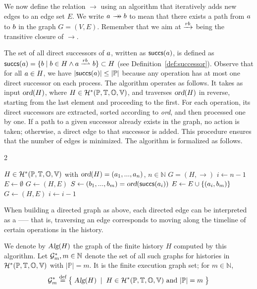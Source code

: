 We now define the relation $\rightarrow$ using an algorithm that iteratively adds new edges to an edge set $E$.  We write $\opa\patharrow\opb$ to mean that there exists a path from $a$ to $b$ in the graph $G=(V,E)$.  Remember that we aim at $\xrightarrow{rb}$ being the transitive closure of $\rightarrow$.

The set of all direct successors of $a$, written as $\mathsf{succs}(a)$, is defined as $\succs(\opa) = \{\opb \mid \opb \in H  \land \opa\dsucp{}\opb \} \subset H$ (see Definition~\ref{def:successor}). 
Observe that for all $a \in H$, we have $|\mathsf{succs}(a)| \leq |\mathbb{P}|$ because any operation has at most one direct successor on each process. 
The algorithm operates as follows. It takes as input $\textsl{ord}(H)$, where $H\in\mathcal{H}^*(\mathbb{P}, \mathbb{T}, \mathbb{O}, \mathbb{V})$, and traverses  $\textsl{ord}(H)$ in reverse, starting from the last element and proceeding to the first. For each operation, its direct successors are extracted, sorted according to \textsl{ord}, and then processed one by one. If a path to a given successor already exists in the graph, no action is taken; otherwise, a direct edge to that successor is added. This procedure ensures that the number of edges is minimized. The algorithm is formalized as follows.

\begin{algorithm}[H]
\renewcommand{\thealgorithm}{} %
\caption{Building a graph of finite history}\label{alg:alg1}
\begin{multicols}{2}
\begin{algorithmic}[1]
\Require $H\in\mathcal{H}^*(\mathbb{P}, \mathbb{T}, \mathbb{O}, \mathbb{V})$ with $\textsl{ord}(H)=(a_1,...,a_n)$, \mbox{$n \in \mathbb{N}$}
\Ensure $G=(H,\rightarrow)$
\State $i \gets n-1$
\State $E\gets\emptyset$
\State $G\gets (H,E)$
\State $S \gets (b_1,...,b_m)=\textsl{ord}(\mathsf{succs}(a_i))$
	\State $E \gets E \cup \{ (a_i,b_m) \}$
	\State $G \gets (H,E)$
\EndIf
\EndFor
\State $i \gets i-1$
\EndWhile
\end{algorithmic}
\end{multicols}
\end{algorithm}

\begin{remark} 
    When building a directed graph as above, each directed edge can be interpreted as a  —-- that is, traversing an edge corresponds to moving along the timeline of certain operations in the history.
\end{remark}

We denote by $\textsl{Alg}(H)$ the graph of the finite history $H$ computed by this algorithm. Let $\mathcal{G}^*_m,m\in\mathbb{N}$ denote the set of all such graphs for histories in  $\mathcal{H}^*(\mathbb{P}, \mathbb{T}, \mathbb{O}, \mathbb{V})$ with $|\mathbb{P}|= m $. It is the finite execution graph set; for $m\in\mathbb{N}$,
\[
\mathcal{G}^*_m \stackrel{\text{def}}{=} \big\{\;  \textsl{Alg}(H) \;\mid \;H \in \mathcal{H}^*(\mathbb{P}, \mathbb{T}, \mathbb{O}, \mathbb{V}) \text{ and }|\mathbb{P}|= m  \;\big\}
\]
